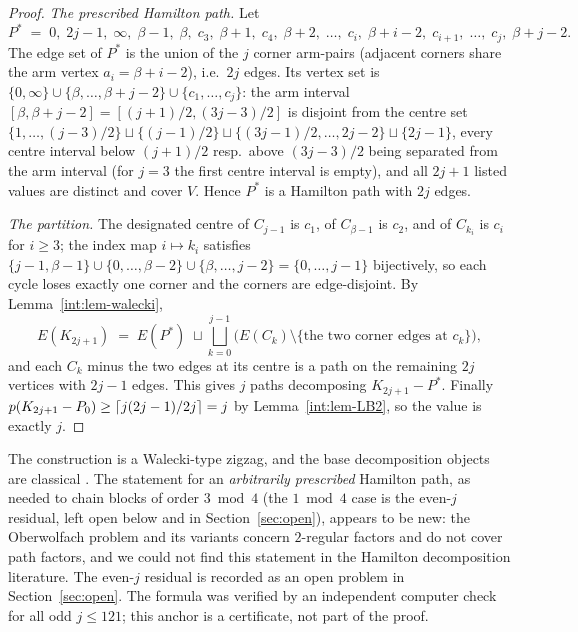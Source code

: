 \begin{proof}
\emph{The prescribed Hamilton path.} Let
\[
P^* \;=\; 0,\;2j-1,\;\infty,\;\beta-1,\;\beta,\;c_3,\;\beta+1,\;c_4,\;\beta+2,\;\dots,\;
c_i,\;\beta+i-2,\;c_{i+1},\;\dots,\;c_j,\;\beta+j-2 .
\]
The edge set of $P^*$ is the union of the $j$ corner arm-pairs (adjacent
corners share the arm vertex $a_i=\beta+i-2$), i.e.\ $2j$ edges. Its
vertex set is
$\{0,\infty\}\cup\{\beta,\dots,\beta+j-2\}\cup\{c_1,\dots,c_j\}$: the arm
interval $[\beta,\beta+j-2]=[(j+1)/2,(3j-3)/2]$ is disjoint from the
centre set
$\{1,\dots,(j-3)/2\}\sqcup\{(j-1)/2\}\sqcup\{(3j-1)/2,\dots,2j-2\}\sqcup\{2j-1\}$,
every centre interval below $(j+1)/2$ resp.\ above $(3j-3)/2$ being
separated from the arm interval (for $j=3$ the first centre interval is
empty), and all $2j+1$ listed values are distinct and cover $V$. Hence
$P^*$ is a Hamilton path with $2j$ edges.

\emph{The partition.}
The designated centre of $C_{j-1}$ is $c_1$, of $C_{\beta-1}$ is $c_2$,
and of $C_{k_i}$ is $c_i$ for $i\ge3$; the index map $i\mapsto k_i$
satisfies
$\{j-1,\beta-1\}\cup\{0,\dots,\beta-2\}\cup\{\beta,\dots,j-2\}=\{0,\dots,j-1\}$
bijectively, so each cycle loses exactly one corner and the corners are
edge-disjoint. By Lemma~\ref{int:lem-walecki},
\[
E(K_{2j+1})\;=\;E(P^*)\;\sqcup\bigsqcup_{k=0}^{j-1}\bigl(E(C_k)\setminus\{\text{the two corner
edges at } c_{k}\}\bigr),
\]
and each $C_k$ minus the two edges at its centre is a path on the
remaining $2j$ vertices with $2j-1$ edges. This gives $j$ paths
decomposing $K_{2j+1}-P^*$. Finally
$p(K_{2j+1}-P_0)\ge\left\lceil j(2j-1)/2j \right\rceil=j$ by Lemma~\ref{int:lem-LB2}, so the
value is exactly $j$.
\end{proof}

\begin{remark}
The construction is a Walecki-type zigzag, and the base decomposition
objects are classical \cite{LP92,Alspach08}. The statement for an
\emph{arbitrarily prescribed} Hamilton path, as needed to chain blocks of
order $3 \bmod 4$ (the $1 \bmod 4$ case is the even-$j$ residual, left
open below and in Section~\ref{sec:open}), appears to be new: the
Oberwolfach problem and its variants concern $2$-regular factors and do
not cover path factors, and we could not find this statement in the
Hamilton decomposition literature. The even-$j$ residual is recorded as an
open problem in Section~\ref{sec:open}. The formula was verified by an
independent computer check for all odd $j\le121$; this anchor is a
certificate, not part of the proof.
\end{remark}

